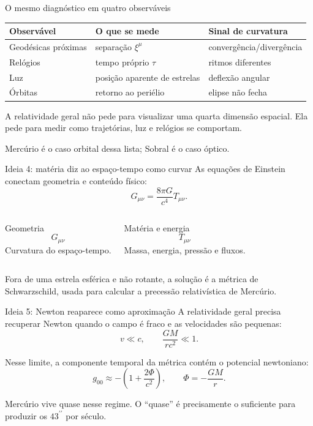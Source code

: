 \documentclass[aspectratio=169,10pt]{beamer}
\newcommand{\arcsec}{^{\prime\prime}}
\begin{document}
\begin{frame}{O mesmo diagnóstico em quatro observáveis}
  \begin{table}
    \centering
    \begin{tabular}{lll}
      \toprule
      Observável & O que se mede & Sinal de curvatura \\
      \midrule
      Geodésicas próximas & separação $\xi^\mu$ & convergência/divergência \\
      Relógios & tempo próprio $\tau$ & ritmos diferentes \\
      Luz & posição aparente de estrelas & deflexão angular \\
      Órbitas & retorno ao periélio & elipse não fecha \\
      \bottomrule
    \end{tabular}
  \end{table}

  \vspace{0.35cm}
  A relatividade geral não pede para visualizar uma quarta dimensão espacial.
  Ela pede para medir como trajetórias, luz e relógios se comportam.

  \vspace{0.25cm}
  Mercúrio é o caso orbital dessa lista; Sobral é o caso óptico.
\end{frame}

\begin{frame}{Ideia 4: matéria diz ao espaço-tempo como curvar}
  As equações de Einstein conectam geometria e conteúdo físico:
  \[
    G_{\mu\nu}
    =
    \frac{8\pi G}{c^4}T_{\mu\nu}.
  \]

  \vspace{0.25cm}
  \begin{columns}[T,onlytextwidth]
    \centering
    {\color{MercuryMuted}Geometria}
    \[
      G_{\mu\nu}
    \]
    Curvatura do espaço-tempo.

    \centering
    {\color{MercuryMuted}Matéria e energia}
    \[
      T_{\mu\nu}
    \]
    Massa, energia, pressão e fluxos.
  \end{columns}

  \vspace{0.35cm}
  Fora de uma estrela esférica e não rotante, a solução é a métrica de Schwarzschild, usada para calcular a precessão relativística de Mercúrio.
\end{frame}

\begin{frame}{Ideia 5: Newton reaparece como aproximação}
  A relatividade geral precisa recuperar Newton quando o campo é fraco e as velocidades são pequenas:
  \[
    v \ll c,
    \qquad
    \frac{GM}{rc^2}\ll 1.
  \]

  \vspace{0.3cm}
  Nesse limite, a componente temporal da métrica contém o potencial newtoniano:
  \[
    g_{00} \approx -\left(1+\frac{2\Phi}{c^2}\right),
    \qquad
    \Phi = -\frac{GM}{r}.
  \]

  \vspace{0.3cm}
  Mercúrio vive quase nesse regime. O ``quase'' é precisamente o suficiente para produzir os $43\arcsec$ por século.
\end{frame}
\end{document}
